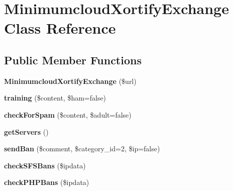 \hypertarget{class_minimumcloud_xortify_exchange}{\section{Minimumcloud\-Xortify\-Exchange Class Reference}
\label{class_minimumcloud_xortify_exchange}
}
\subsection*{Public Member Functions}
\begin{DoxyCompactItemize}
\item 
\hypertarget{class_minimumcloud_xortify_exchange_a8dff748c306a7e99366036717f04b6f9}{{\bfseries Minimumcloud\-Xortify\-Exchange} (\$url)}\label{class_minimumcloud_xortify_exchange_a8dff748c306a7e99366036717f04b6f9}

\item 
\hypertarget{class_minimumcloud_xortify_exchange_a795f1395fa0d0f8e9f5465e94e088b81}{{\bfseries training} (\$content, \$ham=false)}\label{class_minimumcloud_xortify_exchange_a795f1395fa0d0f8e9f5465e94e088b81}

\item 
\hypertarget{class_minimumcloud_xortify_exchange_a3feb4bc858f8b48ef53c1d19aba55809}{{\bfseries check\-For\-Spam} (\$content, \$adult=false)}\label{class_minimumcloud_xortify_exchange_a3feb4bc858f8b48ef53c1d19aba55809}

\item 
\hypertarget{class_minimumcloud_xortify_exchange_a9fd75ffb7df1908d667ff2cf98e201e0}{{\bfseries get\-Servers} ()}\label{class_minimumcloud_xortify_exchange_a9fd75ffb7df1908d667ff2cf98e201e0}

\item 
\hypertarget{class_minimumcloud_xortify_exchange_a01d8b70ec372cd43823120888edd8d65}{{\bfseries send\-Ban} (\$comment, \$category\-\_\-id=2, \$ip=false)}\label{class_minimumcloud_xortify_exchange_a01d8b70ec372cd43823120888edd8d65}

\item 
\hypertarget{class_minimumcloud_xortify_exchange_aa4657ff1aa9f0851a601523573c3fac2}{{\bfseries check\-S\-F\-S\-Bans} (\$ipdata)}\label{class_minimumcloud_xortify_exchange_aa4657ff1aa9f0851a601523573c3fac2}

\item 
\hypertarget{class_minimumcloud_xortify_exchange_a8366484818135234d3f2e4c9176b52f0}{{\bfseries check\-P\-H\-P\-Bans} (\$ipdata)}\label{class_minimumcloud_xortify_exchange_a8366484818135234d3f2e4c9176b52f0}


\end{DoxyCompactItemize}
